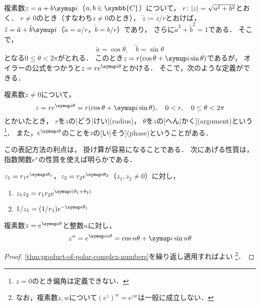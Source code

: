 \documentclass[../sotsu.tex]{subfiles}
\begin{document}
複素数$z = a + b \iu$（$a, b \in \symbb{C}$）について，
$r \colon \lvert z\rvert = \sqrt{a^2 + b^2}$とおく．
$r \neq 0$のとき（すなわち$z \neq 0$のとき），
$\tilde{z} \coloneq z / r$とおけば，
$\tilde{z} = \tilde{a} + \tilde{b} \iu$（$\tilde{a} = a / r$，$\tilde{b} = b / r$）であり，
さらに$\tilde{a}^2 + \tilde{b}^2 = 1$である．
そこで，
\begin{equation*}
    \tilde{a} = \cos \theta,
    \quad
    \tilde{b} = \sin \theta
\end{equation*}
となる$0 \leq \theta < 2\pi$がとれる．
このとき$z = r (\cos \theta + \iu \sin \theta)$であるが，
オイラーの公式をつかうと$z = r e^{\iu \theta}$とかける．
そこで，次のような定義ができる．

\begin{definition}
    \label{dfn:complex-plane}
    複素数$z \neq 0$について，
    \begin{equation*}
        z = r e^{\iu \theta}
          = r ( \cos \theta + \iu \sin \theta ),
        \quad 0 < r,
        \quad 0 \leq \theta < 2\pi
    \end{equation*}
    とかいたとき，
    $r$を$z$の[どう|けい](radius)，
    $\theta$を$z$の[へん|かく](argument)という%
    \footnote{$z = 0$のとき偏角は定義できない．}．
    また，$e^{\iu \theta}$のことを$z$の[い|そう](phase)ということがある．
\end{definition}

この表記方法の利点は，
掛け算が容易になることである．
次にあげる性質は，
指数関数$e^x$の性質を使えば明らかである．

\begin{proposition}
    \label{thm:product-of-polar-complex-numbers}
    $z_1 = r_1 e^{\iu \theta_1}$，$z_2 = r_2 e^{\iu \theta_2}$（$z_1, z_2 \neq 0$）に対し，
    \begin{enumerate}
        \item $z_1 z_2 = r_1 r_2 e^{\iu (\theta_1 + \theta_2)}$
        \item $1 / z_1 = (1 / r_1) e^{-\iu \theta_1}$
    \end{enumerate}
\end{proposition}

\begin{theorem}[ド・モアブルの定理]
    複素数$z = e^{\iu \theta}$と整数$n$に対し，
    \begin{equation*}
        z^n = e^{\iu n \theta}
            = \cos n\theta + \iu \sin n\theta
    \end{equation*}
\end{theorem}

\begin{proof}
    \cref{thm:product-of-polar-complex-numbers}を繰り返し適用すればよい%
    \footnote{
        なお，複素数$z, w$について$(e^z)^w = e^{zw}$は一般に成立しない．
    }．
\end{proof}
\end{document}

